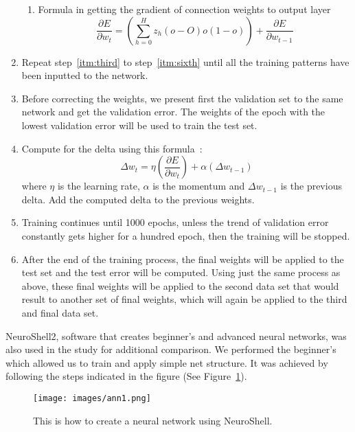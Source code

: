\documentclass[journal]{./IEEE/IEEEtran}
\begin{document}
\begin{enumerate}
\begin{enumerate}
		\item Formula in getting the gradient of connection weights to output layer
		\begin{equation}
		\frac{\partial E}{\partial w_{t}}=(\sum_{h=0}^{H}z_{h}(o-O)o(1-o))+\frac{\partial E}{\partial w_{t-1}}
		\end{equation}
	\end{enumerate}

	\item \label{itm:seventh} Repeat step~\ref{itm:third} to step~\ref{itm:sixth} until all the training patterns have been inputted to the network. 

	\item \label{itm:eight} Before correcting the weights, we present first the validation set to the same network and get the validation error. The weights of the epoch with the lowest validation error will be used to train the test set. 

	\item \label{itm:ninth} Compute for the delta using this formula~\cite{Heaton11b}:
	\begin{equation}
	\Delta w_{t} = \eta (\frac{\partial E}{\partial w_{t}})+\alpha (\Delta w_{t-1})
	\end{equation}
	where $\eta$ is the learning rate, $\alpha$ is the momentum and $ \Delta w_{t-1}$ is the previous delta. Add the computed delta to the previous weights.

	\item \label{itm:tenth} Training continues until 1000 epochs, unless the trend of validation error constantly gets higher for a hundred epoch, then the training will be stopped.

	\item \label{itm:eleventh} After the end of the training process, the final weights will be applied to the test set and the test error will be computed. Using just the same process as above, these final weights will be applied to the second data set that would result to another set of final weights, which will again be applied to the third and final data set.

\end{enumerate}

NeuroShell2, software that creates beginner's and advanced neural networks, was also used in the study for additional comparison. We performed the beginner's which allowed us to train and apply simple net structure. It was achieved by following the steps indicated in the figure (See Figure~\ref{fig:neuroshell}).
\begin{figure}[h]
\begin{center}	
\texttt{[image: images/ann1.png]}
\caption{This is how to create a neural network using NeuroShell.}
\label{fig:neuroshell}
\end{center}
\end{figure}
\end{document}
